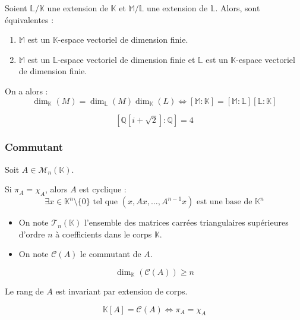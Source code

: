   \begin{corollary}
    Soient $\mathbb{L}/\mathbb{K}$ une extension de $\mathbb{K}$ et $\mathbb{M}/\mathbb{L}$ une extension de $\mathbb{L}$. Alors, sont équivalentes :
    \begin{enumerate}[label=(\roman*)]
      \item $\mathbb{M}$ est un $\mathbb{K}$-espace vectoriel de dimension finie.
      \item $\mathbb{M}$ est un $\mathbb{L}$-espace vectoriel de dimension finie et $\mathbb{L}$ est un $\mathbb{K}$-espace vectoriel de dimension finie.
    \end{enumerate}
    On a alors :
    \[ \dim_{\mathbb{K}}(M) = \dim_{\mathbb{L}}(M) \dim_{\mathbb{K}}(L) \iff [\mathbb{M}:\mathbb{K}] = [\mathbb{M}:\mathbb{L}] [\mathbb{L}:\mathbb{K}] \]
  \end{corollary}


  \begin{example}
    \[ [\mathbb{Q}[i + \sqrt{2}]:\mathbb{Q}] = 4 \]
  \end{example}

  \subsubsection{Commutant}

  Soit $A \in \mathcal{M}_n(\mathbb{K})$.


  \begin{lemma}
    Si $\pi_A = \chi_A$, alors $A$ est cyclique :
    \[ \exists x \in \mathbb{K}^n \setminus \{ 0 \} \text{ tel que } (x, Ax, \dots, A^{n-1}x) \text{ est une base de } \mathbb{K}^n \]
  \end{lemma}


  \begin{notation}
    \begin{itemize}
      \item On note $\mathcal{T}_n(\mathbb{K})$ l'ensemble des matrices carrées triangulaires supérieures d'ordre $n$ à coefficients dans le corps $\mathbb{K}$.
      \item On note $\mathcal{C}(A)$ le commutant de $A$.
    \end{itemize}
  \end{notation}

  \begin{lemma}
    \[ \dim_{\mathbb{K}}(\mathcal{C}(A)) \geq n \]
  \end{lemma}

  \begin{lemma}
    Le rang de $A$ est invariant par extension de corps.
  \end{lemma}


  \begin{theorem}
    \[ \mathbb{K}[A] = \mathcal{C}(A) \iff \pi_A = \chi_A \]
  \end{theorem}

